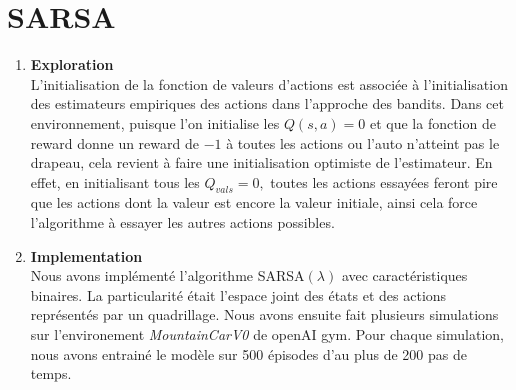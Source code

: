 \documentclass[letterpaper,11pt]{article}
\begin{document}
\section{SARSA}

\begin{enumerate}[label=(\alph*)]

\item \textbf{Exploration}\\
L'initialisation de la fonction de valeurs d'actions est associée à l'initialisation des estimateurs empiriques des actions dans l'approche des bandits. Dans cet environnement, puisque l'on initialise les $Q(s,a)=0$ et que la fonction de reward donne un reward de $-1$ à toutes les actions ou l'auto n'atteint pas le drapeau, cela revient à faire une initialisation optimiste de l'estimateur. En effet, en initialisant tous les $Q_{vals}=0,$ toutes les actions essayées feront pire que les actions dont la valeur est encore la valeur initiale, ainsi cela force l'algorithme à essayer les autres actions possibles.

\item \textbf{Implementation}\\
Nous avons implémenté l'algorithme SARSA$(\lambda)$ avec caractéristiques binaires. La particularité était l'espace joint des états et des actions représentés par un quadrillage.
Nous avons ensuite fait plusieurs simulations sur l'environement \textit{MountainCarV0} de openAI gym.
Pour chaque simulation, nous avons entrainé le modèle sur 500 épisodes d'au plus de 200 pas de temps.


\end{enumerate}
\end{document}
